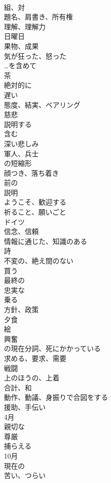 \documentclass[8pt]{extreport}
\begin{document}
\begin{CJK}{UTF8}{min}
\\	組、対
\\	題名、肩書き、所有権
\\	理解、理解力
\\	日曜日
\\	果物、成果
\\	気が狂った、怒った
\\	…を含めて
\\	茶
\\	絶対的に
\\	遅い
\\	態度、結実、ベアリング
\\	慈悲
\\	説明する
\\	含む
\\	深い悲しみ
\\	軍人、兵士
\\	の短縮形
\\	顔つき、落ち着き
\\	前の
\\	説明
\\	ようこそ、歓迎する
\\	祈ること、願いごと
\\	ドイツ
\\	信念、信頼
\\	情報に通じた、知識のある
\\	詩
\\	不変の、絶え間のない
\\	買う
\\	最終の
\\	忠実な
\\	乗る
\\	方針、政策
\\	夕食
\\	絵
\\	興奮
\\	の現在分詞、死にかかっている
\\	求める、要求、需要
\\	戦闘
\\	上のほうの、上着
\\	合計、和
\\	動作、動議、身振りで合図をする
\\	援助、手伝い
\\	4月
\\	親切な
\\	尊厳
\\	捕らえる
\\	10月
\\	現在の
\\	苦い、つらい

\end{CJK}
\end{document}

